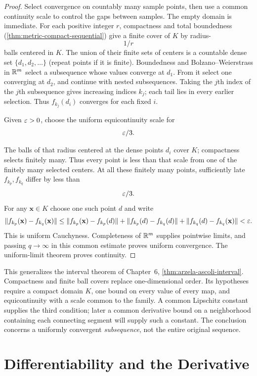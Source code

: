\begin{proof}
Select convergence on countably many sample points, then
use a common continuity scale to control the gaps between samples.
The empty domain is immediate. For each positive integer $r$, compactness
and total boundedness (\cref{thm:metric-compact-sequential}) give a finite
cover of $K$ by radius-
\[
1/r
\]
 balls centered in $K$. The union of their
finite sets of centers is a countable dense set
$\{d_1,d_2,\ldots\}$ (repeat points if it is finite).
Boundedness and Bolzano--Weierstrass in $\mathbb{R}^m$ select a subsequence whose
values converge at $d_1$. From it select one converging at $d_2$, and
continue with nested subsequences. Taking the $j$th index of the $j$th
subsequence gives increasing indices $k_j$; each tail lies in every earlier
selection. Thus $f_{k_j}(d_i)$ converges for each fixed $i$.

Given $\varepsilon>0$, choose the uniform equicontinuity scale for
\[
\varepsilon/3.
\]

The balls of that radius centered at the dense points $d_i$ cover $K$;
compactness selects finitely many. Thus every point is less than that
scale from one of the finitely many selected centers. At all these finitely many points, sufficiently
late $f_{k_p},f_{k_q}$ differ by less than
\[
\varepsilon/3.
\]
 For any $\mathbf{x}\in K$
choose one such point $d$ and write
\[
\|f_{k_p}(\mathbf{x})-f_{k_q}(\mathbf{x})\|\leq
\|f_{k_p}(\mathbf{x})-f_{k_p}(d)\|+
\|f_{k_p}(d)-f_{k_q}(d)\|+
\|f_{k_q}(d)-f_{k_q}(\mathbf{x})\|<\varepsilon.
\]
This is uniform Cauchyness. Completeness of $\mathbb{R}^m$ supplies pointwise
limits, and passing $q\to\infty$ in this common estimate proves uniform
convergence. The uniform-limit theorem proves continuity.
\end{proof}
This generalizes the interval theorem of Chapter~6,
\cref{thm:arzela-ascoli-interval}. Compactness and finite ball covers replace
one-dimensional order. Its hypotheses require a compact domain $K$, one
bound on every value of every map, and equicontinuity with a scale common to
the family. A common Lipschitz constant supplies the third condition; later
a common derivative bound on a neighborhood containing each connecting
segment will supply such a constant. The conclusion concerns a uniformly
convergent \emph{subsequence}, not the entire original sequence.


\section{Differentiability and the Derivative}

